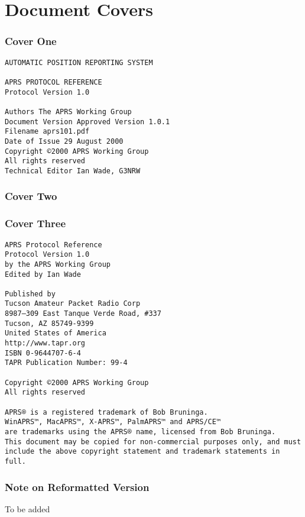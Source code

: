 \part{Document Covers}
\section{Cover One}

\begin{verbatim}
AUTOMATIC POSITION REPORTING SYSTEM

APRS PROTOCOL REFERENCE
Protocol Version 1.0

Authors The APRS Working Group
Document Version Approved Version 1.0.1
Filename aprs101.pdf
Date of Issue 29 August 2000
Copyright ©2000 APRS Working Group
All rights reserved
Technical Editor Ian Wade, G3NRW
\end{verbatim}


\section{Cover Two}



\section{Cover Three}

\begin{verbatim}
APRS Protocol Reference
Protocol Version 1.0
by the APRS Working Group
Edited by Ian Wade

Published by
Tucson Amateur Packet Radio Corp
8987–309 East Tanque Verde Road, #337
Tucson, AZ 85749-9399
United States of America
http://www.tapr.org
ISBN 0-9644707-6-4
TAPR Publication Number: 99-4

Copyright ©2000 APRS Working Group
All rights reserved

APRS® is a registered trademark of Bob Bruninga.
WinAPRS™, MacAPRS™, X-APRS™, PalmAPRS™ and APRS/CE™
are trademarks using the APRS® name, licensed from Bob Bruninga.
This document may be copied for non-commercial purposes only, and must
include the above copyright statement and trademark statements in full.
\end{verbatim}

\section{Note on Reformatted Version}
To be added



